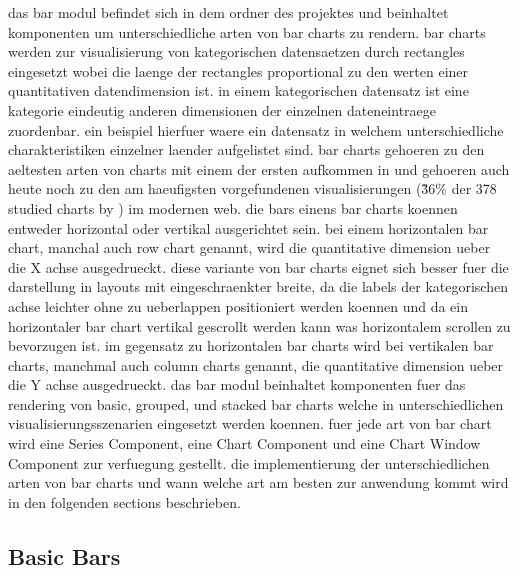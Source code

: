das bar modul befindet sich in dem  ordner des projektes und beinhaltet komponenten um unterschiedliche arten von bar charts zu rendern.
bar charts werden zur visualisierung von kategorischen datensaetzen durch rectangles eingesetzt wobei die laenge der rectangles proportional zu den werten einer quantitativen datendimension ist.
in einem kategorischen datensatz ist eine kategorie eindeutig anderen dimensionen der einzelnen dateneintraege zuordenbar.
ein beispiel hierfuer waere ein datensatz in welchem unterschiedliche charakteristiken einzelner laender aufgelistet sind.
bar charts gehoeren zu den aeltesten arten von charts mit einem der ersten aufkommen in \textcite{CommercialAndPoliticalAtlas} und gehoeren auch heute noch zu den am haeufigsten vorgefundenen visualisierungen (\~36\% der 378 studied charts by \textcite{DesignPatternsTradeOffsRespVisGallery}) im modernen web.
die bars einens bar charts koennen entweder horizontal oder vertikal ausgerichtet sein.
bei einem horizontalen bar chart, manchal auch row chart genannt, wird die quantitative dimension ueber die X achse ausgedrueckt.
diese variante von bar charts eignet sich besser fuer die darstellung in layouts mit eingeschraenkter breite, da die labels der kategorischen achse leichter ohne zu ueberlappen positioniert werden koennen und da ein horizontaler bar chart vertikal gescrollt werden kann was horizontalem scrollen zu bevorzugen ist.
im gegensatz zu horizontalen bar charts wird bei vertikalen bar charts, manchmal auch column charts genannt, die quantitative dimension ueber die Y achse ausgedrueckt. 
das bar modul beinhaltet komponenten fuer das rendering von basic, grouped, und stacked bar charts welche in unterschiedlichen visualisierungsszenarien eingesetzt werden koennen.
fuer jede art von bar chart wird eine Series Component, eine Chart Component und eine Chart Window Component zur verfuegung gestellt. 
die implementierung der unterschiedlichen arten von bar charts und wann welche art am besten zur anwendung kommt wird in den folgenden sections beschrieben.

\subsection{Basic Bars}



